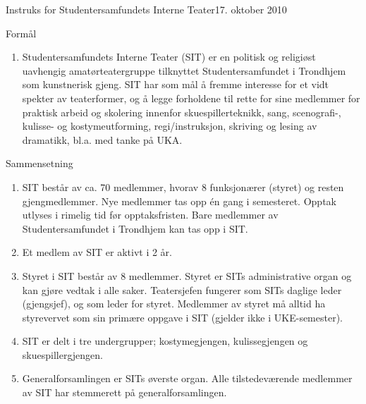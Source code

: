 
\begin{instruks}{Instruks for Studentersamfundets Interne Teater}{17. oktober 2010}{ }

	\begin{instruksledd}{Formål}
		\begin{enumerate}
			\item Studentersamfundets Interne Teater (SIT) er en politisk og religiøst uavhengig
				amatørteatergruppe tilknyttet Studentersamfundet i Trondhjem som kunstnerisk gjeng. SIT har som mål
				å fremme interesse for et vidt spekter av teaterformer, og å legge forholdene til rette for sine
				medlemmer for praktisk arbeid og skolering innenfor skuespillerteknikk, sang, scenografi-, kulisse-
				og kostymeutforming, regi/instruksjon, skriving og lesing av dramatikk, bl.a. med tanke på UKA.
		\end{enumerate}
	\end{instruksledd}

	\begin{instruksledd}{Sammensetning}
		\begin{enumerate}
			\item SIT består av ca. 70 medlemmer, hvorav 8 funksjonærer (styret) og resten
				gjengmedlemmer. Nye medlemmer tas opp én gang i semesteret. Opptak utlyses i rimelig tid før
				opptaksfristen. Bare medlemmer av Studentersamfundet i Trondhjem kan tas opp i SIT.
			\item Et medlem av SIT er aktivt i 2 år.
			\item Styret i SIT består av 8 medlemmer. Styret er SITs administrative organ og kan
				gjøre vedtak i alle saker. Teatersjefen fungerer som SITs daglige leder (gjengsjef), og som leder
				for styret. Medlemmer av styret må alltid ha styrevervet som sin primære oppgave i SIT (gjelder ikke
				i UKE-semester).
			\item SIT er delt i tre undergrupper; kostymegjengen, kulissegjengen og
				skuespillergjengen.
			\item  Generalforsamlingen er SITs øverste organ. Alle tilstedeværende medlemmer
				av SIT har stemmerett på generalforsamlingen.
		\end{enumerate}
	\end{instruksledd}


\end{instruks}
